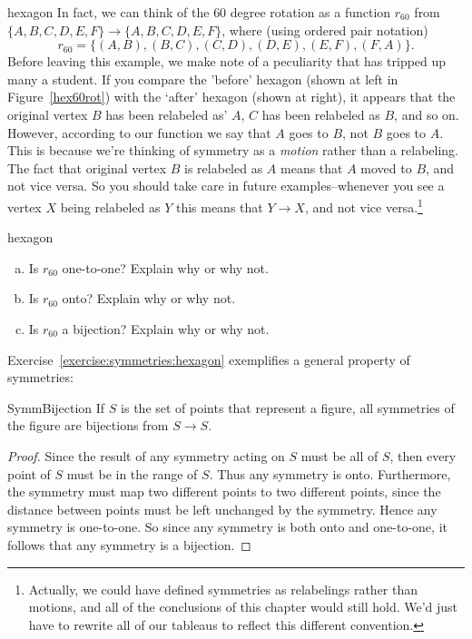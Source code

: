 \begin{example}{hexagon}
In fact, we can think of the $60$ degree rotation as a function $r_{60}$ from $\{A,B,C,D,E,F\} \to \{A,B,C,D,E,F\}$, where (using ordered pair notation)
\[r_{60} = \{ (A,B), (B,C), (C,D), (D,E), (E,F), (F,A) \}.\]
Before leaving this example, we make note of a peculiarity that has tripped up many a student. If you compare the 'before' hexagon (shown at left in Figure~\ref{hex60rot}) with the `after' hexagon (shown at right), it appears that the original vertex $B$ has been relabeled as' $A$, $C$ has been relabeled as $B$, and so on.  However, according to our function we say that $A$ goes to $B$, not $B$ goes to $A$. This is because we're thinking of symmetry as a \emph{motion} rather than a relabeling. The fact that original vertex $B$ is relabeled as $A$ means that $A$ moved to $B$, and not vice versa. So you should take care in future examples--whenever you see a vertex $X$ being relabeled as $Y$ this means that $Y \rightarrow X$, and not vice versa.\footnote{Actually, we could have defined symmetries as relabelings rather than motions, and all of the conclusions of this chapter would still hold. We'd just have to rewrite all of our tableaus to reflect this different convention.}

 

\end{example}

\begin{exercise}{hexagon}
\begin{enumerate}[(a)]
\item
Is $r_{60}$ one-to-one?  Explain why or why not.
\item
Is $r_{60}$ onto?  Explain why or why not.
\item
Is $r_{60}$ a bijection?  Explain why or why not.

\end{enumerate}
\end{exercise}

Exercise~\ref{exercise:symmetries:hexagon} exemplifies a general property of symmetries:

\begin{prop}{SymmBijection}  
If $S$ is the set of points that represent a figure, all symmetries of the figure are bijections from $S \to S$.
\end{prop}

\begin{proof}
Since the result of any symmetry acting on $S$ must be all of $S$, then every point of $S$ must be in the range of $S$. Thus any symmetry is onto. Furthermore, the symmetry must map two different points to two different points, since the distance between points must be left unchanged by the symmetry. Hence any symmetry is one-to-one.  So since any symmetry is both onto and one-to-one, it follows that any symmetry is a bijection.
\end{proof}
\medskip

